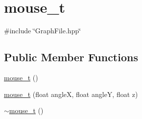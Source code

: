 \hypertarget{classmouse__t}{}\section{mouse\+\_\+t}
\label{classmouse__t}


{\ttfamily \#include \char`\"{}Graph\+File.\+hpp\char`\"{}}

\subsection*{Public Member Functions}
\begin{DoxyCompactItemize}
\item 
\hyperlink{classmouse__t_a0117a5a34b22dea1ff9b9eb2872ed107}{mouse\+\_\+t} ()
\item 
\hyperlink{classmouse__t_a691b04ef52f94573b23d11dda776c151}{mouse\+\_\+t} (float angleX, float angleY, float z)
\item 
\hyperlink{classmouse__t_abe009b8c5b82914804113d5a85ee641a}{$\sim$mouse\+\_\+t} ()
\end{DoxyCompactItemize}
